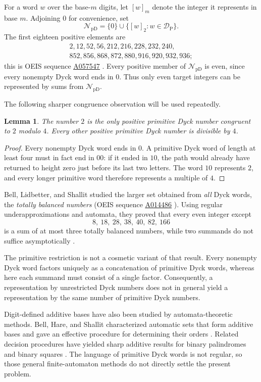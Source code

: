 \documentclass[12pt]{article}
\theoremstyle{plain}
\newtheorem{lemma}[theorem]{Lemma}
\newcommand{\val}[2]{[#1]_{#2}}
\newcommand{\NpD}{\mathcal{N}_{\mathrm{pD}}}
\newcommand{\DP}{\mathcal{D}_{\mathrm{P}}}
\newcommand{\seqnum}[1]{\href{https://oeis.org/#1}{\rm \underline{#1}}}
\begin{document}
For a word $w$ over the base-$m$ digits, let $\val{w}{m}$ denote the
integer it represents in base $m$.  Adjoining $0$ for convenience, set
\[
 \NpD=\{0\}\cup\{\val{w}{2}:w\in\DP\}.
\]
The first eighteen positive elements are
\[
\begin{gathered}
2,12,52,56,212,216,228,232,240,\\
852,856,868,872,880,916,920,932,936;
\end{gathered}
\]
this is OEIS sequence \seqnum{A057547} \cite{OEIS}.  Every positive member of
$\NpD$ is even, since every nonempty Dyck word ends in $0$.  Thus only
even target integers can be represented by sums from $\NpD$.

The following sharper congruence observation will be used repeatedly.

\begin{lemma}\label{lem:mod4}
The number $2$ is the only positive primitive Dyck number congruent to
$2$ modulo $4$.  Every other positive primitive Dyck number is divisible
by $4$.
\end{lemma}

\begin{proof}
Every nonempty Dyck word ends in $0$.  A primitive Dyck word of length at
least four must in fact end in $00$: if it ended in $10$, the path would
already have returned to height zero just before its last two letters.
The word $10$ represents $2$, and every longer primitive word therefore
represents a multiple of $4$.
\end{proof}

Bell, Lidbetter, and Shallit studied the larger set obtained from
\emph{all} Dyck words, the \emph{totally balanced numbers} (OEIS sequence
\seqnum{A014486} \cite{OEIS}).  Using regular underapproximations and automata,
they proved that every even integer except
\[
        8,\ 18,\ 28,\ 38,\ 40,\ 82,\ 166
\]
is a sum of at most three totally balanced numbers, while two summands
do not suffice asymptotically \cite[Thm.\ 14]{BLS}.

The primitive restriction is not a cosmetic variant of that result.
Every nonempty Dyck word factors uniquely as a concatenation of
primitive Dyck words, whereas here each summand must consist of a single
factor.  Consequently, a representation by unrestricted Dyck numbers
does not in general yield a representation by the same number of
primitive Dyck numbers.

Digit-defined additive bases have also been studied by automata-theoretic
methods.  Bell, Hare, and Shallit characterized automatic sets that form
additive bases and gave an effective procedure for determining their
orders \cite{BHS}.  Related decision procedures have yielded sharp
additive results for binary palindromes \cite{RSS} and binary squares
\cite{MNRS}.  The language of primitive Dyck words is not regular, so
those general finite-automaton methods do not directly settle the
present problem.
\end{document}
